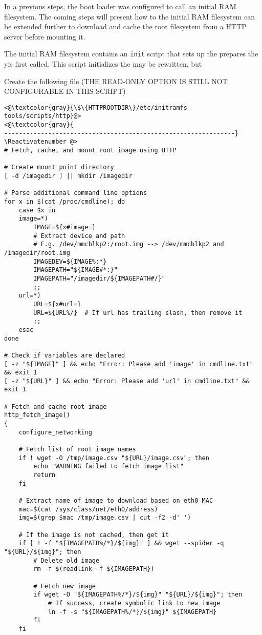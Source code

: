 In a previous steps, the boot loader was configured to call an initial \ac{RAM}
filesystem. The coming steps will present how to the initial \ac{RAM}
filesystem can be extended further to download and cache the root filesystem
from a \ac{HTTP} server before mounting it.

The initial \ac{RAM} filesystem contains an \texttt{init} script that
sets up the prepares the yis first
called. This script initializes the  may be rewritten, but

Create the following file (THE READ-ONLY OPTION IS STILL NOT CONFIGURABLE IN THIS SCRIPT)
\Suppressnumber\begin{lstlisting}[]
<@\textcolor{gray}{\$\{HTTPROOTDIR\}/etc/initramfs-tools/scripts/http}@>
<@\textcolor{gray}{
---------------------------------------------------------------}
\Reactivatenumber @>
# Fetch, cache, and mount root image using HTTP

# Create mount point directory
[ -d /imagedir ] || mkdir /imagedir

# Parse additional command line options
for x in $(cat /proc/cmdline); do
    case $x in
    image=*)
        IMAGE=${x#image=}
        # Extract device and path
        # E.g. /dev/mmcblkp2:/root.img --> /dev/mmcblkp2 and /imagedir/root.img
        IMAGEDEV=${IMAGE%:*}
        IMAGEPATH="${IMAGE#*:}"
        IMAGEPATH="/imagedir/${IMAGEPATH#/}"
        ;;
    url=*)
        URL=${x#url=}
        URL=${URL%/}  # If url has trailing slash, then remove it
        ;;
    esac
done

# Check if variables are declared
[ -z "${IMAGE}" ] && echo "Error: Please add 'image' in cmdline.txt" && exit 1
[ -z "${URL}" ] && echo "Error: Please add 'url' in cmdline.txt" && exit 1

# Fetch and cache root image
http_fetch_image()
{
    configure_networking

    # Fetch list of root image names
    if ! wget -O /tmp/image.csv "${URL}/image.csv"; then
        echo "WARNING failed to fetch image list"
        return
    fi

    # Extract name of image to download based on eth0 MAC
    mac=$(cat /sys/class/net/eth0/address)
    img=$(grep $mac /tmp/image.csv | cut -f2 -d' ')

    # If the image is not cached, then get it
    if [ ! -f "${IMAGEPATH%/*}/${img}" ] && wget --spider -q "${URL}/${img}"; then
        # Delete old image
        rm -f $(readlink -f ${IMAGEPATH})

        # Fetch new image
        if wget -O "${IMAGEPATH%/*}/${img}" "${URL}/${img}"; then
            # If success, create symbolic link to new image
            ln -f -s "${IMAGEPATH%/*}/${img}" ${IMAGEPATH}
        fi
    fi


\end{lstlisting}
